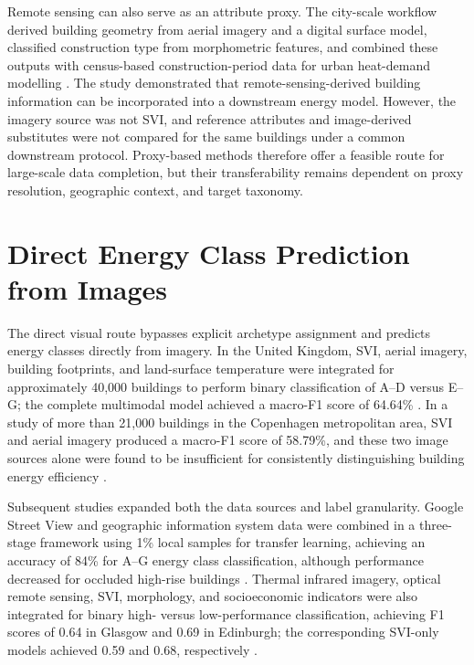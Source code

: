 Remote sensing can also serve as an attribute proxy.
The city-scale workflow derived building geometry from aerial imagery and a digital surface model, classified construction type from morphometric features, and combined these outputs with census-based construction-period data for urban heat-demand modelling \parencite{wurm2021}.
The study demonstrated that remote-sensing-derived building information can be incorporated into a downstream energy model.
However, the imagery source was not \ac{SVI}, and reference attributes and image-derived substitutes were not compared for the same buildings under a common downstream protocol.
Proxy-based methods therefore offer a feasible route for large-scale data completion, but their transferability remains dependent on proxy resolution, geographic context, and target taxonomy.

\section{Direct Energy Class Prediction from Images}
\label{sec:direct_image_to_energy}

The direct visual route bypasses explicit archetype assignment and predicts energy classes directly from imagery.
In the United Kingdom, \ac{SVI}, aerial imagery, building footprints, and land-surface temperature were integrated for approximately 40,000 buildings to perform binary classification of A--D versus E--G; the complete multimodal model achieved a macro-F1 score of 64.64\% \parencite{mayer2023uk}.
In a study of more than 21,000 buildings in the Copenhagen metropolitan area, \ac{SVI} and aerial imagery produced a macro-F1 score of 58.79\%, and these two image sources alone were found to be insufficient for consistently distinguishing building energy efficiency \parencite{mayer2023dk}.

Subsequent studies expanded both the data sources and label granularity.
Google Street View and geographic information system data were combined in a three-stage framework using 1\% local samples for transfer learning, achieving an accuracy of 84\% for A--G energy class classification, although performance decreased for occluded high-rise buildings \parencite{liu2025}.
Thermal infrared imagery, optical remote sensing, \ac{SVI}, morphology, and socioeconomic indicators were also integrated for binary high- versus low-performance classification, achieving F1 scores of 0.64 in Glasgow and 0.69 in Edinburgh; the corresponding \ac{SVI}-only models achieved 0.59 and 0.68, respectively \parencite{sun2026}.


